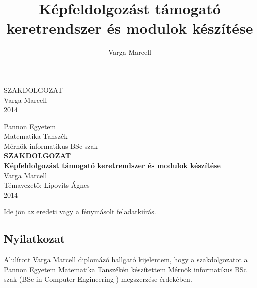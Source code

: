\documentclass[a4paper,12pt,oneside]{report}
\title{Képfeldolgozást támogató keretrendszer és modulok készítése}
\author{Varga Marcell}
\date{}
\begin{document}

\setcounter{chapter}{1}

\pagestyle{empty}
{
    \begin{center}
    \vspace*{5cm}
    {
        \Huge SZAKDOLGOZAT}\\
        \vspace*{10cm}
        {\LARGE Varga Marcell}\\
        \vspace*{3cm}
        {\LARGE 2014}
    \end{center}
}
\newpage

\begin{center}
{
    \Large Pannon Egyetem\\
    Matematika Tanszék\vspace*{3mm}\\
    Mérnök informatikus BSc szak
}
    \vspace*{2cm}\\
    {\LARGE \bf SZAKDOLGOZAT}
    \vspace{3cm}\\
    {\LARGE\bf Képfeldolgozást támogató keretrendszer és modulok készítése}
    \vspace{3cm}\\
    {\large Varga Marcell}
    \vspace{6cm}
    \\
    {\large Témavezető: Lipovits Ágnes}
    \vspace{1cm}\\
    {\large 2014}
\end{center}
\normalsize
\newpage

Ide jön az eredeti vagy a fénymásolt feladatkiírás.
\newpage

\begin{center}
\section*{Nyilatkozat}
\end{center}

Alulírott Varga Marcell diplomázó hallgató kijelentem, hogy a szakdolgozatot a Pannon Egyetem Matematika Tanszékén készítettem Mérnök informatikus BSc szak (BSc in Computer Engineering
) megszerzése érdekében.
\end{document}
